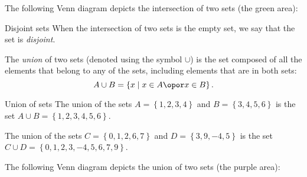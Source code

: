 The following Venn diagram depicts the intersection of two sets (the green area):
\begin{figure}
	\centering
\end{figure}

\begin{note}{Disjoint sets}{}
	When the intersection of two sets is the empty set, we say that the set is \emph{disjoint}.
\end{note}

The \emph{union} of two sets (denoted using the symbol $\cup$) is the set composed of all the elements that belong to any of the sets, including elements that are in both sets:
\begin{equation}
	A\cup B = \left\{ x \mid x\in A \opor x\in B \right\}.
	\label{eq:union}
\end{equation}

\begin{example}{Union of sets}{}
	The union of the sets $A=\left\{ 1,2,3,4 \right\}$ and $B=\left\{ 3,4,5,6 \right\}$ is the set $A\cup B=\left\{ 1,2,3,4,5,6 \right\}$.

	The union of the sets $C=\left\{ 0,1,2,6,7 \right\}$ and $D=\left\{ 3,9,-4,5 \right\}$ is the set $C\cup D=\left\{ 0,1,2,3,-4,5,6,7,9 \right\}$.
\end{example}

The following Venn diagram depicts the union of two sets (the purple area):
\begin{figure}[H]
	\centering
\end{figure}

